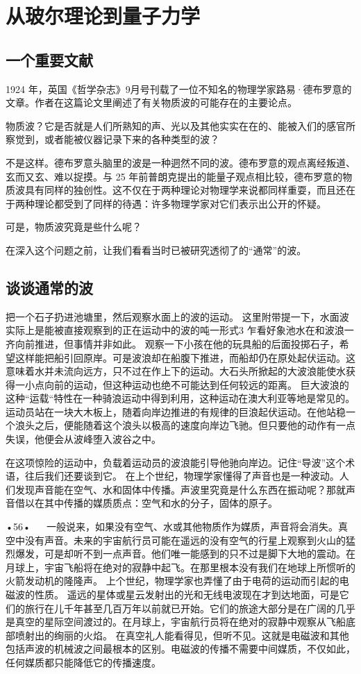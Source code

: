 \chapter{从玻尔理论到量子力学}

\section{一个重要文献}

1924 年，英国《哲学杂志》9月号刊载了一位不知名的物理学家路易·德布罗意的文章。作者在这篇论文里阐述了有关物质波的可能存在的主要论点。

物质波？它是否就是人们所熟知的声、光以及其他实实在在的、能被入们的感官所察觉到，或者能被仪器记录下来的各种类型的波？

不是这样。德布罗意头脑里的波是一种迵然不同的波。德布罗意的观点离经叛道、玄而又玄、难以捉摸。与 25 年前普朗克提出的能量子观点相比较，德布罗意的物质波具有同样的独创性。这不仅在于两种理论对物理学来说都同样重耍，而且还在于两种理论都受到了同样的待遇：许多物理学家对它们表示出公开的怀疑。

可是，物质波究竟是些什么呢？

在深入这个问题之前，让我们看看当时已被研究透彻了的“通常”的波。

\section{谈谈通常的波}

把一个石子扔进池塘里，然后观察水面上的波的运动。
这里附带提一下，水面波实际上是能被直接观察到的正在运动中的波的吨一形式3
乍看好象池水在和波浪一齐向前推进，但事情并非如此。
观察一下小孩在他的玩具船的后面投掷石子，希望这样能把船引回原岸。可是波浪却在船腹下推进，而船却仍在原处起伏运动。这意味着水并未流向远方，只不过在作上下的运动。大石头所掀起的大波浪能使水获得一小点向前的运动，但这种运动也绝不可能达到任何较远的距离。
巨大波浪的这种“运载“特性在一种骑浪运动中得到利用，这种运动在澳大利亚等地是常见的。运动员站在一块大木板上，随着向岸边推进的有规律的巨浪起伏运动。在他站稳一个浪头之后，便能随着这个浪头以极高的速度向岸边飞驰。但只要他的动作有一点失误，他便会从波峰堕入波谷之中。

在这项惊险的运动中，负载着运动员的波浪能引导他驰向岸边。记住“导波”这个术语，往后我们还要谈到它。
在上个世纪，物理学家懂得了声音也是一种波动。人们发现声音能在空气、水和固体中传播。声波里究竟是什么东西在振动呢？那就声音借以在其中传播的媒质质点：空气和水的分子，固体的原子。

•56•
  
一般说来，如果没有空气、水或其他物质作为媒质，声音将会消失。真空中没有声音。未来的宇宙航行员可能在遥远的没有空气的行星上观察到火山的猛烈爆发，可是却听不到一点声音。他们唯一能感到的只不过是脚下大地的震动。在月球上，宇宙飞船将在绝对的寂静中起飞。在那里根本没有我们在地球上所惯听的火箭发动机的隆隆声。
上个世纪，物理学家也弄懂了由于电荷的运动而引起的电磁波的性质。
遥远的星体或星云发射出的光和无线电波现在才到达地面，可是它们的旅行在儿千年甚至几百万年以前就已开始。它们的旅途大部分是在广阔的几乎是真空的星际空间渡过的。在月球上，宇宙航行员将在绝对的寂静中观察从飞船底部喷射出的绚丽的火焰。
在真空礼人能看得见，但听不见。这就是电磁波和其他包括声波的机械波之间最根本的区别。电磁波的传播不需要中间媒质，不仅如此，任何媒质都只能降低它的传播速度。


